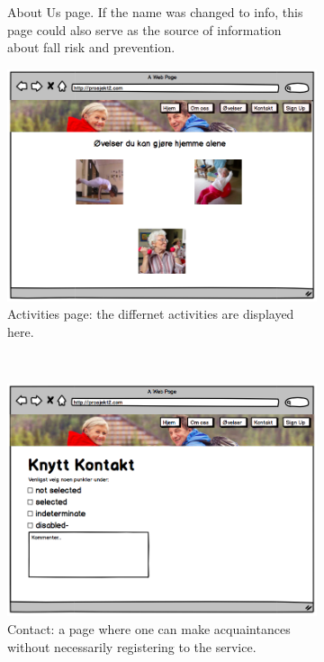 \begin{figure}[H]
\begin{subfigure}{.5\textwidth}
  \caption{About Us page. If the name was changed to info, this page could also serve as the source of information about fall risk and prevention.}
  \label{fig:videoAbout}
\end{subfigure}%
\begin{subfigure}{.5\textwidth}
  \centering
  \includegraphics[width=.8\linewidth]{wireframes/web/Activities}
  \caption{Activities page: the differnet activities are displayed here.}
  \label{fig:videoACtivities}
\end{subfigure}\\
\break
\begin{subfigure}{.5\textwidth}
  \centering
  \includegraphics[width=.8\linewidth]{wireframes/web/Contact}
  \caption{Contact: a page where one can make acquaintances without necessarily registering to the service. }
  \label{fig:videoContact}
\end{subfigure}%
\begin{subfigure}{.5\textwidth}
  \centering

\end{subfigure}
\end{figure}
